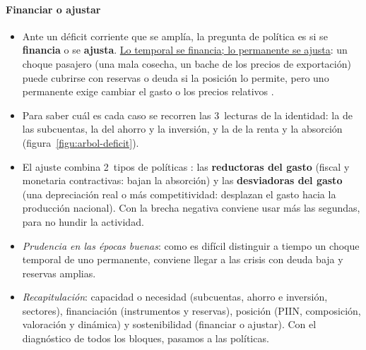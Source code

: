 \documentclass[11pt]{article}
\begin{document}
\paragraph{Financiar o ajustar}
\begin{itemize}
\item Ante un déficit corriente que se amplía, la pregunta de política es si se \textbf{financia} o se \textbf{ajusta}. \uline{Lo temporal se financia; lo permanente se ajusta}: un choque pasajero (una mala cosecha, un bache de los precios de exportación) puede cubrirse con reservas o deuda si la posición lo permite, pero uno permanente exige cambiar el gasto o los precios relativos \parencite{FMI2013CaseStudy}.
\item Para saber cuál es cada caso se recorren las 3~lecturas de la identidad: la de las subcuentas, la del ahorro y la inversión, y la de la renta y la absorción (figura~\ref{figu:arbol-deficit}).
\item El ajuste combina 2~tipos de políticas \parencite{Johnson1958}: las \textbf{reductoras del gasto} (fiscal y monetaria contractivas: bajan la absorción) y las \textbf{desviadoras del gasto} (una depreciación real o más competitividad: desplazan el gasto hacia la producción nacional). Con la brecha negativa conviene usar más las segundas, para no hundir la actividad.
\item \emph{Prudencia en las épocas buenas}: como es difícil distinguir a tiempo un choque temporal de uno permanente, conviene llegar a las crisis con deuda baja y reservas amplias.
\end{itemize}

\begin{infografia}[!htb]
\centering
\caption{Un déficit corriente que se amplía: diagnóstico y tratamiento}\label{figu:arbol-deficit}
\end{infografia}

\begin{itemize}
\item \emph{Recapitulación}: capacidad o necesidad (subcuentas, ahorro e inversión, sectores), financiación (instrumentos y reservas), posición (PIIN, composición, valoración y dinámica) y sostenibilidad (financiar o ajustar). Con el diagnóstico de todos los bloques, pasamos a las políticas.
\end{itemize}
\end{document}
